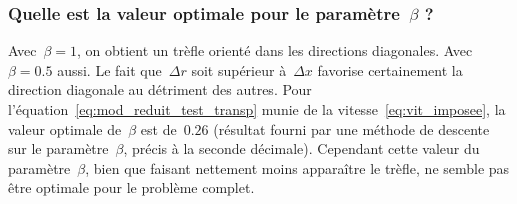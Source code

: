 \documentclass[main.tex]{subfiles}
\begin{document}
\subsubsection{
Quelle est la valeur optimale pour le paramètre~$\beta$ ?} 
Avec~$\beta=1$, on obtient un trèfle orienté dans les directions diagonales. 
Avec~$\beta=0.5$ aussi. Le fait que~$\Delta r$ soit supérieur à~$\Delta x$ favorise certainement la direction diagonale au détriment des autres. 
Pour l'équation~\eqref{eq:mod_reduit_test_transp} munie de la vitesse~\eqref{eq:vit_imposee}, la valeur optimale de~$\beta$ est de~$0.26$ (résultat fourni par une méthode de descente sur le paramètre~$\beta$, précis à la seconde décimale). 
Cependant cette valeur du paramètre~$\beta$, bien que faisant nettement moins apparaître le trèfle, ne semble pas être optimale pour le problème complet. 
\end{document}
